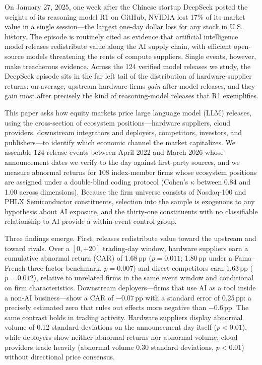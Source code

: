 \documentclass[review,12pt,authoryear]{elsarticle}
\newcommand{\pp}{\,pp}
\begin{document}
On January 27, 2025, one week after the Chinese startup DeepSeek posted the
weights of its reasoning model R1 on GitHub, NVIDIA lost 17\% of its market
value in a single session---the largest one-day dollar loss for any stock in
U.S. history. The episode is routinely cited as evidence that artificial
intelligence model releases redistribute value along the AI supply chain, with
efficient open-source models threatening the rents of compute suppliers. Single
events, however, make treacherous evidence. Across the 124 verified model
releases we study, the DeepSeek episode sits in the far left tail of the
distribution of hardware-supplier returns: on average, upstream hardware firms
\emph{gain} after model releases, and they gain most after precisely the kind
of reasoning-model releases that R1 exemplifies.

This paper asks how equity markets price large language model (LLM) releases,
using the cross-section of ecosystem positions---hardware suppliers, cloud
providers, downstream integrators and deployers, competitors, investors, and
publishers---to identify which economic channel the market capitalizes. We
assemble 124 release events between April 2022 and March 2026 whose
announcement dates we verify to the day against first-party sources, and we
measure abnormal returns for 108 index-member firms whose ecosystem positions
are assigned under a double-blind coding protocol (Cohen's $\kappa$ between
0.84 and 1.00 across dimensions). Because the firm universe consists of
Nasdaq-100 and PHLX Semiconductor constituents, selection into the sample is
exogenous to any hypothesis about AI exposure, and the thirty-one constituents
with no classifiable relationship to AI provide a within-event control group.

Three findings emerge. First, releases redistribute value toward the upstream
and toward rivals. Over a $[0,+20]$ trading-day window, hardware suppliers earn
a cumulative abnormal return (CAR) of 1.68\pp{} ($p=0.011$; 1.80\pp{} under a
Fama--French three-factor benchmark, $p=0.007$) and direct competitors earn
1.63\pp{} ($p=0.012$), relative to unrelated firms in the same event window and
conditional on firm characteristics. Downstream deployers---firms that use AI
as a tool inside a non-AI business---show a CAR of $-0.07$\pp{} with a standard
error of 0.25\pp{}: a precisely estimated zero that rules out effects more
negative than $-0.6$\pp{}. The same contrast holds in trading activity.
Hardware suppliers display abnormal volume of 0.12 standard deviations on the
announcement day itself ($p<0.01$), while deployers show neither abnormal
returns nor abnormal volume; cloud providers trade heavily (abnormal volume
0.30 standard deviations, $p<0.01$) without directional price consensus.
\end{document}

